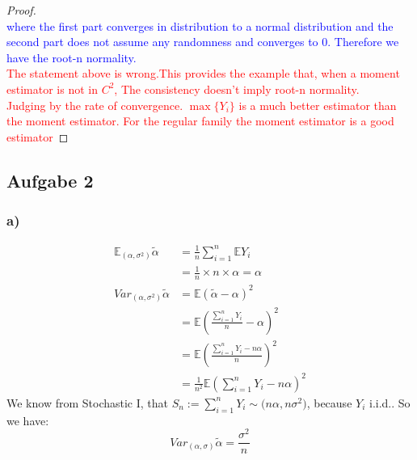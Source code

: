 \documentclass[a4paper,11pt]{article}
\theoremstyle{definition}
\theoremstyle{remark}
\begin{document}
\begin{proof}
\begin{equation*}
\end{equation*}
\textcolor{blue}{where the first part converges in distribution to a normal distribution and the second part does not assume any randomness and converges to 0. Therefore we have the root-n normality.}\\
\textcolor{red}{The statement above is wrong.This provides the example that, when a moment estimator is not in $C^2$, The consistency doesn't imply root-n normality. \\
	Judging by the rate of convergence. $\max\{Y_i\}$ is a much better estimator than the moment estimator. For the regular family the moment estimator is a good estimator}

\end{proof}


\subsection*{Aufgabe 2}
\subsubsection*{a)}
\begin{equation*}
	\begin{aligned}
		\mathbb{E}_{(\alpha, \sigma^2)} \tilde{\alpha} &= \frac{1}{n}\sum_{i = 1}^n \mathbb{E}Y_i\\
		&= \frac{1}{n} \times n\times \alpha = \alpha\\
		Var_{(\alpha, \sigma^2)}\tilde{\alpha} &= \mathbb{E}(\tilde{\alpha} - \alpha)^2\\
		&= \mathbb{E}(\frac{\sum_{i = 1}^n Y_i}{n} - \alpha)^2\\
		&= \mathbb{E}(\frac{\sum_{i = 1}^n Y_i - n \alpha}{n})^2\\
		&= \frac{1}{n^2} \mathbb{E}(\sum_{i = 1}^n Y_i - n \alpha)^2
	\end{aligned}
\end{equation*}
We know from Stochastic I, that $S_n := \sum_{i =1}^n Y_i \sim \mathcal(n \alpha, n \sigma^2)$, because $Y_i$ i.i.d.. So we have:
\begin{equation*}
	Var_{(\alpha, \sigma)}\tilde{\alpha} = \frac{\sigma^2}{n}
\end{equation*}
\end{document}
